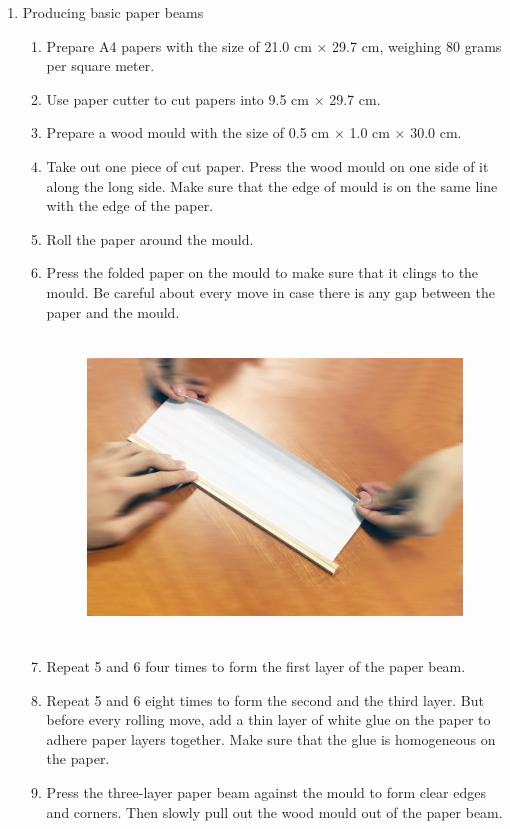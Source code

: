 \begin{enumerate}
\item Producing basic paper beams
	\begin{enumerate}
	\item Prepare A4 papers with the size of 21.0 cm $\times$ 29.7 cm, weighing 80 grams per square meter.
	\item Use paper cutter to cut papers into 9.5 cm $\times$ 29.7 cm.
	\item Prepare a wood mould with the size of 0.5 cm $\times$ 1.0 cm $\times$ 30.0 cm.
	\item Take out one piece of cut paper. Press the wood mould on one side of it along the long side. Make sure that the edge of mould is on the same line with the edge of the paper.
	\item Roll the paper around the mould. 
	\item Press the folded paper on the mould to make sure that it clings to the mould. Be careful about every move in case there is any gap between the paper and the mould.  
	\begin{figure}[H]
	\begin{center}
	\includegraphics[height=8cm]{figure/procedureJuanzhi/p1}
	\end{center}
	\end{figure}
	\item Repeat 5 and 6 four times to form the first layer of the paper beam.
	\item Repeat 5 and 6 eight times to form the second and the third layer. But before every rolling move, add a thin layer of white glue on the paper to adhere paper layers together. Make sure that the glue is homogeneous on the paper.
	\item Press the three-layer paper beam against the mould to form clear edges and corners. Then slowly pull out the wood mould out of the paper beam.

\end{enumerate}
\end{enumerate}
